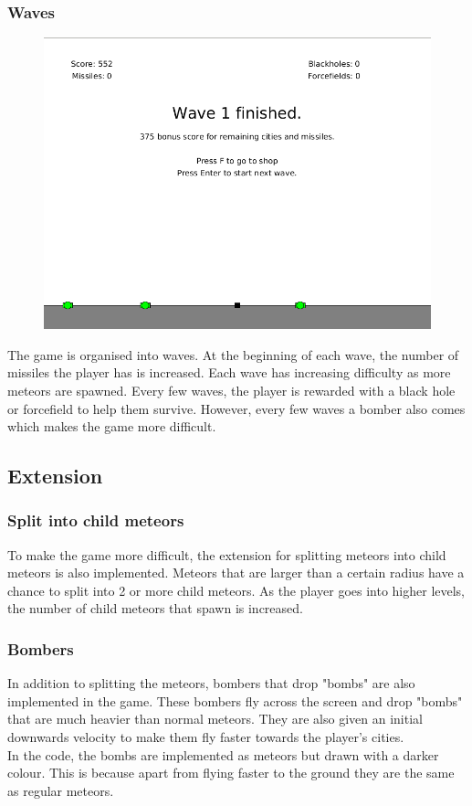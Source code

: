 \documentclass{article}
\newcommand{\n}[0]{\\[\baselineskip]}
\begin{document}
\subsubsection*{Waves}
\begin{figure}[H]
\centering
\includegraphics[width=1\textwidth, keepaspectratio]{imgs/WaveFinished.png}
\end{figure}
The game is organised into waves. At the beginning of each wave, the number of missiles the player has is increased. Each wave has increasing difficulty as more meteors are spawned. Every few waves, the player is rewarded with a black hole or forcefield to help them survive. However, every few waves a bomber also comes which makes the game more difficult.


\subsection{Extension}

\subsubsection*{Split into child meteors}
To make the game more difficult, the extension for splitting meteors into child meteors is also implemented. Meteors that are larger than a certain radius have a chance to split into 2 or more child meteors. As the player goes into higher levels, the number of child meteors that spawn is increased. 

\subsubsection*{Bombers}
In addition to splitting the meteors, bombers that drop "bombs" are also implemented in the game. These bombers fly across the screen and drop "bombs" that are much heavier than normal meteors. They are also given an initial downwards velocity to make them fly faster towards the player's cities.
\n
In the code, the bombs are implemented as meteors but drawn with a darker colour. This is because apart from flying faster to the ground they are the same as regular meteors. 
\end{document}
